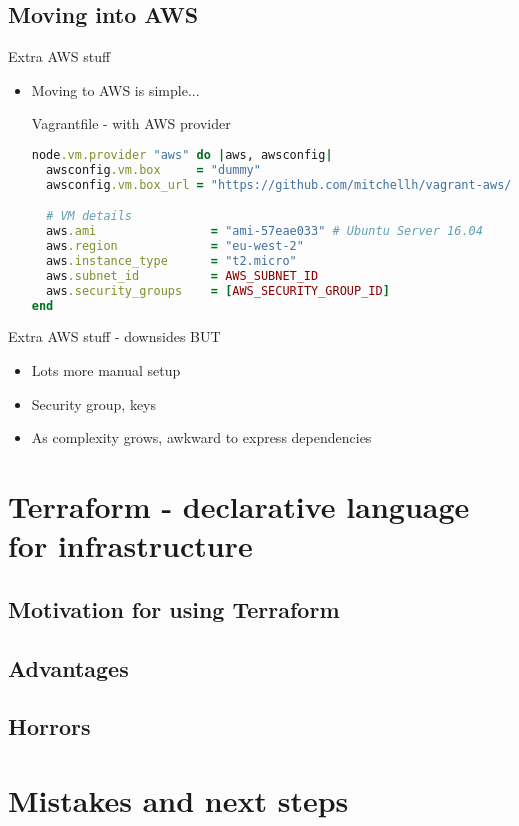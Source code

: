 \documentclass[xcolor=dvipsnames]{beamer}
\begin{document}
\subsection[Cloudy time]{Moving into AWS}
\begin{frame}[fragile]{Extra AWS stuff}
  \begin{itemize}
    \item Moving to AWS is simple...
    \begin{block}{Vagrantfile - with AWS provider}
      \begin{lstlisting}[language=ruby,
                         columns=fullflexible,
                         basicstyle=\ttfamily\small,
                         keywordstyle=\color{blue}\ttfamily,
                         stringstyle=\color{red}\ttfamily,
                         commentstyle=\color{green}\ttfamily,
                         breaklines=true]
node.vm.provider "aws" do |aws, awsconfig|
  awsconfig.vm.box     = "dummy"
  awsconfig.vm.box_url = "https://github.com/mitchellh/vagrant-aws/raw/master/dummy.box"

  # VM details
  aws.ami                = "ami-57eae033" # Ubuntu Server 16.04
  aws.region             = "eu-west-2"
  aws.instance_type      = "t2.micro"
  aws.subnet_id          = AWS_SUBNET_ID
  aws.security_groups    = [AWS_SECURITY_GROUP_ID]
end
      \end{lstlisting}
    \end{block}
  \end{itemize}
\end{frame}

\begin{frame}{Extra AWS stuff - downsides}
BUT
  \begin{itemize}
    \item Lots more manual setup
    \item Security group, keys
    \item As complexity grows, awkward to express dependencies
  \end{itemize}
\end{frame}

\section[Terraform]{Terraform - declarative language for infrastructure}

\subsection[Motivation]{Motivation for using Terraform}

\subsection{Advantages}

\subsection{Horrors}



\section[Next steps]{Mistakes and next steps}
\end{document}
